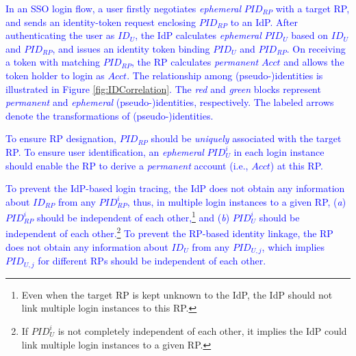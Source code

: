 \textcolor{blue}{In an SSO login flow, %
    a user firstly negotiates \emph{ephemeral} $PID_{RP}$ with a target RP,
and sends an identity-token request enclosing $PID_{RP}$ to an IdP.
After authenticating the user as $ID_U$, the IdP calculates \emph{ephemeral} $PID_U$ based on $ID_U$ and $PID_{RP}$,
    and issues an identity token binding $PID_U$ and $PID_{RP}$.
On receiving a token with matching $PID_{RP}$,
    the RP calculates \emph{permanent} $Acct$ and allows the token holder to login as $Acct$.
%
The relationship among (pseudo-)identities is illustrated in Figure \ref{fig:IDCorrelation}.
The \emph{red} and \emph{green} blocks represent \emph{permanent} and \emph{ephemeral} (pseudo-)identities, respectively.
The labeled arrows denote the transformations of (pseudo-)identities.}


\textcolor{blue}{To ensure RP designation,
     $PID_{RP}$ should be \emph{uniquely} associated with the target RP.
To ensure user identification,
    an \emph{ephemeral} $PID_{U}^i$ in each login instance should enable the RP to derive a \emph{permanent} account  (i.e., $Acct$) at this RP.}


\textcolor{blue}{To prevent the IdP-based login tracing,
    the IdP does not obtain any information about $ID_{RP}$ from any $PID_{RP}^i$,
        thus, in multiple login instances to a given RP,
           (\emph{a})  $PID_{RP}^i$ should
         be independent of each other,\footnote{Even when the target RP is kept unknown to the IdP,
            the IdP should not link multiple login instances to this RP.}
and  (\emph{b}) %
 $PID_U^i$ should be independent of each other.\footnote{If $PID_U^i$ is not completely independent of each other,
         it implies the IdP could link multiple login instances to a given RP.}
To prevent the RP-based identity linkage,
    the RP does not obtain any information about $ID_U$ from any $PID_{U,j}$,
    which implies $PID_{U,j}$ for different RPs should be independent of each other.}



